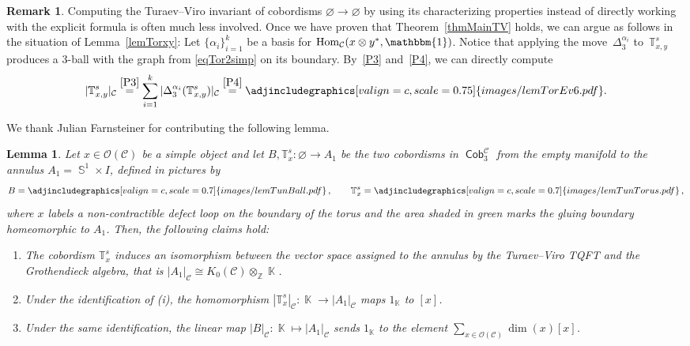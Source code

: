 \documentclass[pdftex]{sigma}
\DeclareMathOperator{\Hom}{Hom}
\DeclareMathOperator{\K}{\mathbb{K}}
\DeclareMathOperator{\Sp}{\mathbb{S}}
\DeclareMathOperator{\Cob}{\mathsf{Cob}}
\numberwithin{equation}{section}
\newtheorem{Lemma}[Lemma]{Lemma}
\theoremstyle{definition}
\newtheorem{Remark}[Remark]{Remark}
\begin{document}
\begin{Remark} \label{remTorus}
Computing the Turaev--Viro invariant of cobordisms $\varnothing \rightarrow \varnothing$ by using its characterizing properties instead of directly working with the explicit formula is often much less involved. Once we have proven that Theorem~\ref{thmMainTV} holds, we can argue as follows in the situation of Lemma~\ref{lemTorxy}: Let $\{\alpha_i\}_{i = 1}^k$ be a basis for $\Hom_{\mathcal{C}}(x \otimes y^*, \mathbbm{1})$. Notice that applying the move~$\Delta_3^{\alpha_i}$ to~$\mathbb{T}_{x,y}^s$ produces a 3-ball with the graph from \eqref{eqTor2simp} on its boundary. By~\ref{P3} and~\ref{P4}, we can directly compute
 \begin{align*}
 |\mathbb{T}_{x,y}^s|_{\mathcal{C}} \overset{\rm \ref{P3}}{=} \sum_{i = 1}^k|\Delta_3^{\alpha_i} (\mathbb{T}_{x,y}^s )|_{\mathcal{C}} \overset{\rm \ref{P4}}{=} \adjincludegraphics[valign=c, scale = 0.75]{images/lemTorEv6.pdf}.
 \end{align*}
\end{Remark}
We thank Julian Farnsteiner for contributing the following lemma.
\begin{Lemma}
\label{lemProp2}
 Let $x \in \mathcal{O}(\mathcal{C})$ be a simple object and let $B, \mathbb{T}_x^s\colon \varnothing \rightarrow A_1$ be the two cobordisms in $\Cob_3^{\mathcal{C}}$ from the empty manifold to the annulus $A_1 = \Sp^1 \times I$, defined in pictures by
 \begin{align*}
 B = \adjincludegraphics[valign=c, scale = 0.7]{images/lemTunBall.pdf}\,, \qquad \mathbb{T}_x^s = \adjincludegraphics[valign=c, scale = 0.7]{images/lemTunTorus.pdf}\, ,
 \end{align*}
 where $x$ labels a non-contractible defect loop on the boundary of the torus and the area shaded in green marks the gluing boundary homeomorphic to $A_1$. Then, the following claims hold:
 \begin{enumerate}[$(i)$]\itemsep=0pt
 \item The cobordism $\mathbb{T}_x^s$ induces an isomorphism between the vector space assigned to the annulus by the Turaev--Viro TQFT and the Grothendieck algebra, that is $|A_1|_{\mathcal{C}} \cong K_0(\mathcal{C}) \otimes_{\mathbb{Z}} \K$.
 \item Under the identification of (i), the homomorphism $|\mathbb{T}_x^s|_{\mathcal{C}}\colon \K \rightarrow |A_1|_{\mathcal{C}}$ maps $1_{\K}$ to $[x]$.
 \item Under the same identification, the linear map $|B|_{\mathcal{C}}\colon \K \mapsto |A_1|_{\mathcal{C}}$ sends $1_{\K}$ to the element $\sum_{x \in \mathcal{O}(\mathcal{C})}\dim(x) [x]$.

 \end{enumerate}
\end{Lemma}
\end{document}
